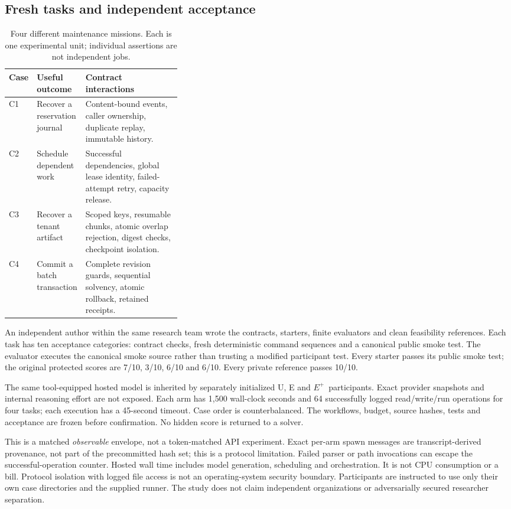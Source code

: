 \documentclass[11pt,letterpaper]{article}
\newcommand{\Eplus}{\ensuremath{E^{+}}}
\begin{document}
\subsection{Fresh tasks and independent acceptance}
\begin{table}[H]\small
\begin{tabularx}{\linewidth}{@{}p{0.06\linewidth}p{0.28\linewidth}X@{}}\toprule
Case & Useful outcome & Contract interactions \\ \midrule
C1 & Recover a reservation journal & Content-bound events, caller ownership, duplicate replay, immutable history. \\
C2 & Schedule dependent work & Successful dependencies, global lease identity, failed-attempt retry, capacity release. \\
C3 & Recover a tenant artifact & Scoped keys, resumable chunks, atomic overlap rejection, digest checks, checkpoint isolation. \\
C4 & Commit a batch transaction & Complete revision guards, sequential solvency, atomic rollback, retained receipts. \\ \bottomrule
\end{tabularx}
\caption{Four different maintenance missions. Each is one experimental unit; individual assertions are not independent jobs.}
\end{table}

An independent author within the same research team wrote the contracts, starters, finite evaluators and clean feasibility references. Each task has ten acceptance categories: contract checks, fresh deterministic command sequences and a canonical public smoke test. The evaluator executes the canonical smoke source rather than trusting a modified participant test. Every starter passes its public smoke test; the original protected scores are 7/10, 3/10, 6/10 and 6/10. Every private reference passes 10/10.

The same tool-equipped hosted model is inherited by separately initialized U, E and \Eplus\ participants. Exact provider snapshots and internal reasoning effort are not exposed. Each arm has 1,500 wall-clock seconds and 64 successfully logged read/write/run operations for four tasks; each execution has a 45-second timeout. Case order is counterbalanced. The workflows, budget, source hashes, tests and acceptance are frozen before confirmation. No hidden score is returned to a solver.

This is a matched \emph{observable} envelope, not a token-matched API experiment. Exact per-arm spawn messages are transcript-derived provenance, not part of the precommitted hash set; this is a protocol limitation. Failed parser or path invocations can escape the successful-operation counter. Hosted wall time includes model generation, scheduling and orchestration. It is not CPU consumption or a bill. Protocol isolation with logged file access is not an operating-system security boundary. Participants are instructed to use only their own case directories and the supplied runner. The study does not claim independent organizations or adversarially secured researcher separation.
\end{document}

